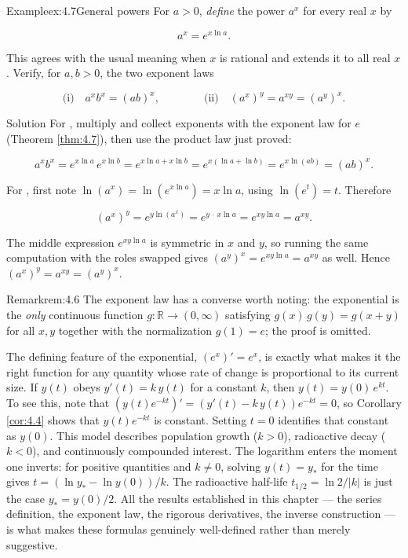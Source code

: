 \documentclass[a4paper,12pt,oneside]{memoir}
\begin{document}
\begin{workedexample}
\begin{envexample}{Example}{ex:4.7}{General powers}
For \(a > 0\), \emph{define} the power \(a^{x}\) for every real \(x\) by

\[ a^{x} = e^{x \ln a}. \]

This agrees with the usual meaning when \(x\) is rational and extends it to all real \(x\). Verify, for \(a, b > 0\), the two exponent laws

\[ \text{(i)}\quad a^{x} b^{x} = (ab)^{x}, \qquad\qquad \text{(ii)}\quad (a^{x})^{y} = a^{xy} = (a^{y})^{x}. \]
\end{envexample}
\begin{envsolution}{Solution}{}{}
For , multiply and collect exponents with the exponent law for \(e\) (Theorem \ref{thm:4.7}), then use the product law just proved:

\[ a^{x} b^{x} = e^{x \ln a}\, e^{x \ln b} = e^{x \ln a + x \ln b} = e^{x(\ln a + \ln b)} = e^{x \ln(ab)} = (ab)^{x}. \]

For , first note \(\ln(a^{x}) = \ln\!\left(e^{x \ln a}\right) = x \ln a\), using \(\ln(e^{t}) = t\). Therefore

\[ (a^{x})^{y} = e^{y \ln(a^{x})} = e^{y \,\cdot\, x \ln a} = e^{xy \ln a} = a^{xy}. \]

The middle expression \(e^{xy \ln a}\) is symmetric in \(x\) and \(y\), so running the same computation with the roles swapped gives \((a^{y})^{x} = e^{xy \ln a} = a^{xy}\) as well. Hence \((a^{x})^{y} = a^{xy} = (a^{y})^{x}\). \qedmark
\end{envsolution}
\end{workedexample}
\begin{envremark}{Remark}{rem:4.6}{}
The exponent law has a converse worth noting: the exponential is the \emph{only} continuous function \(g \colon \mathbb{R} \to (0, \infty)\) satisfying \(g(x)\,g(y) = g(x + y)\) for all \(x, y\) together with the normalization \(g(1) = e\); the proof is omitted.
\end{envremark}
The defining feature of the exponential, \((e^{x})' = e^{x}\), is exactly what makes it the right function for any quantity whose rate of change is proportional to its current size. If \(y(t)\) obeys \(y'(t) = k\,y(t)\) for a constant \(k\), then \(y(t) = y(0)\,e^{kt}\). To see this, note that \((y(t)e^{-kt})' = (y'(t) - k\,y(t))e^{-kt} = 0\), so Corollary \ref{cor:4.4} shows that \(y(t)e^{-kt}\) is constant. Setting \(t = 0\) identifies that constant as \(y(0)\). This model describes population growth (\(k > 0\)), radioactive decay (\(k < 0\)), and continuously compounded interest. The logarithm enters the moment one inverts: for positive quantities and \(k \ne 0\), solving \(y(t) = y_{\ast}\) for the time gives \(t = (\ln y_{\ast} - \ln y(0))/k\). The radioactive half-life \(t_{1/2} = \ln 2 / \lvert k \rvert\) is just the case \(y_{\ast} = y(0)/2\). All the results established in this chapter — the series definition, the exponent law, the rigorous derivatives, the inverse construction — is what makes these formulas genuinely well-defined rather than merely suggestive.
\end{document}
